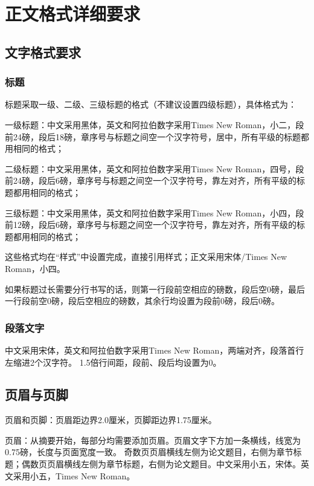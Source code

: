 \chapter{正文格式详细要求}

\section{文字格式要求}

\subsection{标题}

标题采取一级、二级、三级标题的格式（不建议设置四级标题），具体格式为：

一级标题：中文采用黑体，英文和阿拉伯数字采用Times New Roman，小二，段前24磅，段后18磅，章序号与标题之间空一个汉字符号，居中，所有平级的标题都用相同的格式；

二级标题：中文采用黑体，英文和阿拉伯数字采用Times New Roman，四号，段前24磅，段后6磅，章序号与标题之间空一个汉字符号，靠左对齐，所有平级的标题都用相同的格式；

三级标题：中文采用黑体，英文和阿拉伯数字采用Times New Roman，小四，段前12磅，段后6磅，章序号与标题之间空一个汉字符号，靠左对齐，所有平级的标题都用相同的格式；

这些格式均在“样式”中设置完成，直接引用样式；正文采用宋体/Times New Roman，小四。

如果标题过长需要分行书写的话，则第一行段前空相应的磅数，段后空0磅，最后一行段前空0磅，段后空相应的磅数，其余行均设置为段前0磅，段后0磅。

\subsection{段落文字}

中文采用宋体，英文和阿拉伯数字采用Times New Roman，两端对齐，段落首行左缩进2个汉字符。
1.5倍行间距，段前、段后均设置为0。

\section{页眉与页脚}

页眉和页脚：页眉距边界2.0厘米，页脚距边界1.75厘米。

页眉：从摘要开始，每部分均需要添加页眉。页眉文字下方加一条横线，线宽为0.75磅，长度与页面宽度一致。
奇数页页眉横线左侧为论文题目，右侧为章节标题；偶数页页眉横线左侧为章节标题，右侧为论文题目。中文采用小五，宋体。英文采用小五，Times New Roman。

